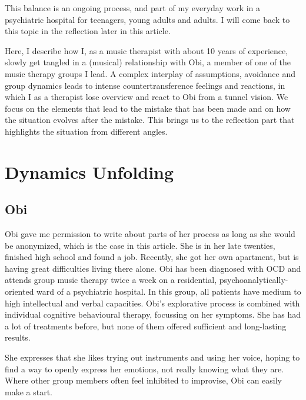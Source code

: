 \documentclass[authordate, empirical, issue]{jote-new-article}
\begin{document}
This balance is an ongoing process, and part of my everyday work in a psychiatric hospital for teenagers, young adults and adults. I will come back to this topic in the reflection later in this article.



Here, I describe how I, as a music therapist with about 10 years of experience, slowly get tangled in a (musical) relationship with Obi, a member of one of the music therapy groups I lead. A complex interplay of assumptions, avoidance and group dynamics leads to intense countertransference feelings and reactions, in which I as a therapist lose overview and react to Obi from a tunnel vision. We focus on the elements that lead to the mistake that has been made and on how the situation evolves after the mistake. This brings us to the reflection part that highlights the situation from different angles.







\section{Dynamics Unfolding}



\subsection{Obi}
Obi gave me permission to write about parts of her process as long as she would be anonymized, which is the case in this article. She is in her late twenties, finished high school and found a job. Recently, she got her own apartment, but is having great difficulties living there alone. Obi has been diagnosed with OCD and attends group music therapy twice a week on a residential, psychoanalytically-oriented ward of a psychiatric hospital. In this group, all patients have medium to high intellectual and verbal capacities. Obi's explorative process is combined with individual cognitive behavioural therapy, focussing on her symptoms. She has had a lot of treatments before, but none of them offered sufficient and long-lasting results.



She expresses that she likes trying out instruments and using her voice, hoping to find a way to openly express her emotions, not really knowing what they are. Where other group members often feel inhibited to improvise, Obi can easily make a start.
\end{document}
